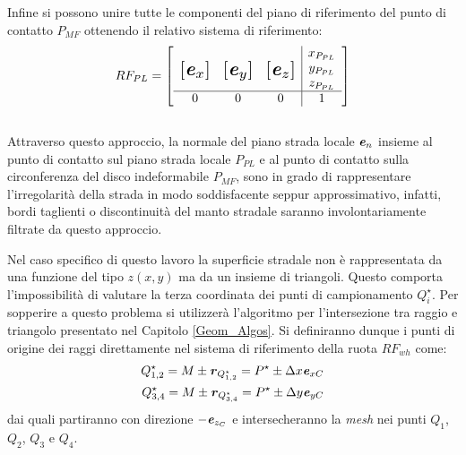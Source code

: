 Infine si possono unire tutte le componenti del piano di riferimento del punto di contatto $P_{MF}$ ottenendo il relativo sistema di riferimento:
%
\begin{equation}
RF_{PL} = \left[
\begin{array}{ccc|c}
& & & x_{P_{PL}}\\
\multirow{3}{*}{\raisebox{20mm}{\scalebox{1.5}{$\left[\textbf{\textit{e}}_x\right]$}}} & \multirow{3}{*}{\raisebox{20mm}{\scalebox{1.5}{$\left[\textbf{\textit{e}}_y\right]$}}} & \multirow{3}{*}{\raisebox{20mm}{\scalebox{1.5}{$\left[\textbf{\textit{e}}_z\right]$}}} & y_{P_{PL}}\\
& & & z_{P_{PL}}\\ \hline
0 & 0 & 0 & 1
\end{array}\right]
\end{equation}\\
Attraverso questo approccio, la normale del piano strada locale $\textbf{\textit{e}}_{n}$ insieme al punto di contatto sul piano strada locale $P_{PL}$ e al punto di contatto sulla circonferenza del disco indeformabile $P_{MF}$, sono in grado di rappresentare l'irregolarità della strada in modo soddisfacente seppur approssimativo, infatti, bordi taglienti o discontinuità del manto stradale saranno involontariamente filtrate da questo approccio.

Nel caso specifico di questo lavoro la superficie stradale non è rappresentata da una funzione del tipo $z(x,y)$ ma da un insieme di triangoli. Questo comporta l'impossibilità di valutare la terza coordinata dei punti di campionamento $Q_i^\star$. Per sopperire a questo problema si utilizzerà l'algoritmo per l'intersezione tra raggio e triangolo presentato nel Capitolo \ref{Geom_Algos}. Si definiranno dunque i punti di origine dei raggi direttamente nel sistema di riferimento della ruota $RF_{wh}$ come:
\begin{equation}
\begin{split}
Q^\star_{1,2} = M \pm \textbf{\textit{r}}_{Q^\star_{1,2}} = P^\star \pm \Delta x \textbf{\textit{e}}_{xC} \\
Q^\star_{3,4} = M \pm \textbf{\textit{r}}_{Q^\star_{3,4}} = P^\star \pm \Delta y \textbf{\textit{e}}_{yC}
\end{split}
\end{equation}
dai quali partiranno con direzione $-\textbf{\textit{e}}_{z_C}$ e intersecheranno la \textit{mesh} nei punti $Q_1$, $Q_2$, $Q_3$ e $Q_4$.

